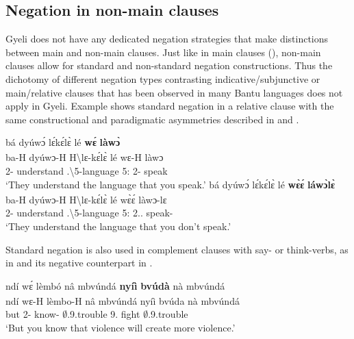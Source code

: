 \documentclass[output=paper,colorlinks=true, citecolor=brown,draftmode]{langscibook}
\begin{document}
\subsection{Negation in non-main clauses}
\label{sec:gye:non-main}

Gyeli does not have any dedicated negation strategies that make distinctions between main and non-main clauses. Just like in main clauses (), non-main clauses allow for standard and non-standard negation constructions.
Thus the dichotomy of different negation types contrasting indicative/subjunctive or main/relative clauses that has been observed in many Bantu languages \citep{Nurse2008} does not apply in Gyeli. Example  shows standard negation in a relative clause with the same constructional and paradigmatic asymmetries described in 
 and .

\ea\label{SREL} 
\ea\label{SREL1}
  \glll bá dyúwɔ́ lɛ́kɛ́lɛ̀ {\ob}lé {\bfseries wɛ́} {\bfseries làwɔ̀}{\cb}\textsubscript{{\REL}}\\
      ba-H dyúwɔ-H {H\backslash{}lɛ-kɛ́lɛ̀} {\db}lé wɛ-H làwɔ\\
         2-{\PRS} understand {{\OBJ}.{\LINK}\backslash{}5-language} {\db}5:{\ATTR} 2{\SG}-{\PRS} speak\\
    \trans `They understand the language that you speak.'
\ex\label{SREL2} 
  \glll bá dyúwɔ́ lɛ́kɛ́lɛ̀ {\ob}lé {\bfseries wɛ̀ɛ́} {\bfseries láwɔ̀lɛ̀}{\cb}\textsubscript{{\REL}}\\
        ba-H dyúwɔ-H {H\backslash{}lɛ-kɛ́lɛ̀} {\db}lé wɛ̀ɛ́ làwɔ-lɛ\\
         2-{\PRS} understand {{\OBJ}.{\LINK}\backslash{}5-language} {\db}5:{\ATTR} 2{\SG}.{\PRS}.{\NEG} speak-{\NEG}\\
    \trans `They understand the language that you don't speak.'
\z
\z

Standard negation is also used in complement clauses with say- or think-verbs, as in  and its negative counterpart in . 

\ea\label{COMP3} 
  \glll ndí wɛ́ lèmbó {\ob}nâ mbvúndá {\bfseries nyíì} {\bfseries bvúdà} nà mbvúndá{\cb}\textsubscript{{\COMP}}\\
        ndí wɛ-H lèmbo-H {\db}nâ mbvúndá nyíì bvúda nà mbvúndá\\
         but 2{\SG}-{\PRS} know-{\R} {\db}{\COMP} $\emptyset$.9.trouble 9.{\FUT} fight {\COM} $\emptyset$.9.trouble\\
    \trans `But you know that violence will create more violence.'
\z
\end{document}
